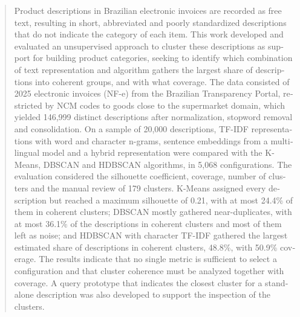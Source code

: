 \documentclass[english,brazilian]{UNISINOSmonografia}
\begin{document}
\begin{otherlanguage}{english}
\begin{abstract}
Product descriptions in Brazilian electronic invoices are recorded as free text, resulting in short, abbreviated and poorly standardized descriptions that do not indicate the category of each item. This work developed and evaluated an unsupervised approach to cluster these descriptions as support for building product categories, seeking to identify which combination of text representation and algorithm gathers the largest share of descriptions into coherent groups, and with what coverage. The data consisted of 2025 electronic invoices (NF-e) from the Brazilian Transparency Portal, restricted by NCM codes to goods close to the supermarket domain, which yielded 146,999 distinct descriptions after normalization, stopword removal and consolidation. On a sample of 20,000 descriptions, TF-IDF representations with word and character n-grams, sentence embeddings from a multilingual model and a hybrid representation were compared with the K-Means, DBSCAN and HDBSCAN algorithms, in 5,068 configurations. The evaluation considered the silhouette coefficient, coverage, number of clusters and the manual review of 179 clusters. K-Means assigned every description but reached a maximum silhouette of 0.21, with at most 24.4\% of them in coherent clusters; DBSCAN mostly gathered near-duplicates, with at most 36.1\% of the descriptions in coherent clusters and most of them left as noise; and HDBSCAN with character TF-IDF gathered the largest estimated share of descriptions in coherent clusters, 48.8\%, with 50.9\% coverage. The results indicate that no single metric is sufficient to select a configuration and that cluster coherence must be analyzed together with coverage. A query prototype that indicates the closest cluster for a standalone description was also developed to support the inspection of the clusters.
\end{abstract}
\end{otherlanguage}



\end{document}
